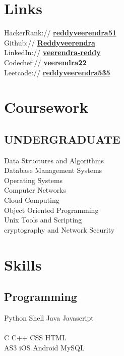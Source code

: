 \documentclass[]{deedy-resume-openfont}
\begin{document}
\begin{minipage}[t]{0.33\textwidth}
\section{Links} 
HackerRank://  \href{https://www.hackerrank.com/reddyveerendra51}{\bf reddyveerendra51} \\
Github:// \href{https://github.com/Reddyveerendra}{\bf Reddyveerendra} \\
LinkedIn://  \href{https://www.linkedin.com/in/veerendra-reddy/}{\bf veerendra-reddy} \\
Codechef://  \href{https://www.codechef.com/users/veerendra22}{\bf veerendra22} \\
Leetcode://  \href{https://leetcode.com/reddyveerendra535}{\bf reddyveerendra535} \\

\sectionsep
\section{Coursework}
\subsection{UNDERGRADUATE}
Data Structures and Algorithms\\
Database Management Systems\\
Operating Systems\\
Computer Networks\\
Cloud Computing\\
Object Oriented Programming\\
Unix Tools and Scripting\\
cryptography and Network Security\\
\sectionsep


\section{Skills}
\subsection{Programming}
Python \textbullet{}   Shell \textbullet{} Java \textbullet{} Javascript  \\ \\ 
C \textbullet{} C++ \textbullet{} CSS \textbullet{} HTML\\
AS3 \textbullet{} iOS \textbullet{} Android \textbullet{} MySQL
\sectionsep

%
%

\end{minipage} 
\end{document}
